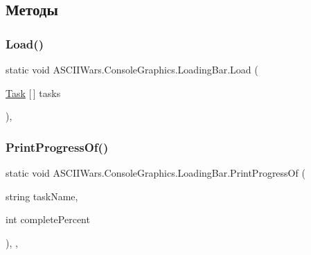 \subsection{Методы}
\hypertarget{class_a_s_c_i_i_wars_1_1_console_graphics_1_1_loading_bar_a608770219ead82a4ce54ad22f6c3ba38}{}\label{class_a_s_c_i_i_wars_1_1_console_graphics_1_1_loading_bar_a608770219ead82a4ce54ad22f6c3ba38} 
\subsubsection{\texorpdfstring{Load()}{Load()}}
{\footnotesize\ttfamily static void A\+S\+C\+I\+I\+Wars.\+Console\+Graphics.\+Loading\+Bar.\+Load (\begin{DoxyParamCaption}\item[{\hyperlink{class_a_s_c_i_i_wars_1_1_console_graphics_1_1_task}{Task} \mbox{[}$\,$\mbox{]}}]{tasks }\end{DoxyParamCaption})\hspace{0.3cm}{\ttfamily [inline]}, {\ttfamily [static]}}

\hypertarget{class_a_s_c_i_i_wars_1_1_console_graphics_1_1_loading_bar_a5a407d4e78a5d3789ba0348b219b14ae}{}\label{class_a_s_c_i_i_wars_1_1_console_graphics_1_1_loading_bar_a5a407d4e78a5d3789ba0348b219b14ae} 
\subsubsection{\texorpdfstring{Print\+Progress\+Of()}{PrintProgressOf()}}
{\footnotesize\ttfamily static void A\+S\+C\+I\+I\+Wars.\+Console\+Graphics.\+Loading\+Bar.\+Print\+Progress\+Of (\begin{DoxyParamCaption}\item[{string}]{task\+Name,  }\item[{int}]{complete\+Percent }\end{DoxyParamCaption})\hspace{0.3cm}{\ttfamily [inline]}, {\ttfamily [static]}, {\ttfamily [private]}}



